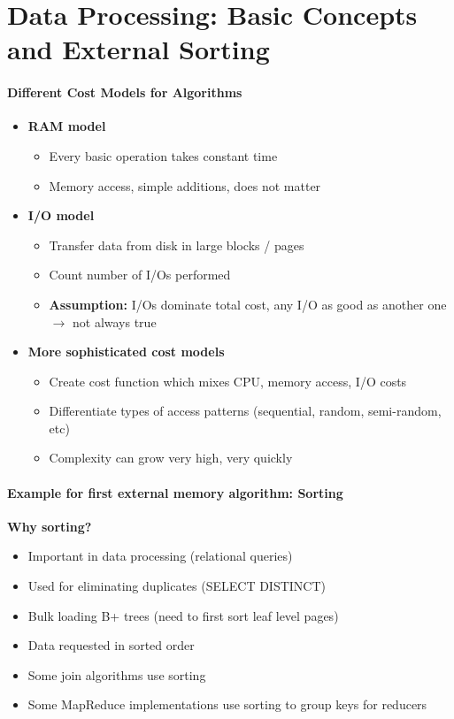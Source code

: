 \section{Data Processing: Basic Concepts and External Sorting}

\paragraph{Different Cost Models for Algorithms}
\begin{itemize}
\item \textbf{RAM model}
  \begin{itemize}
  \item Every basic operation takes constant time
  \item Memory access, simple additions, does not matter
  \end{itemize}

\item \textbf{I/O model}
  \begin{itemize}
  \item Transfer data from disk in large blocks / pages
  \item Count number of I/Os performed
  \item \textbf{Assumption:} I/Os dominate total cost, any
    I/O as good as another one $\rightarrow$ not always true
  \end{itemize}

\item \textbf{More sophisticated cost models}
  \begin{itemize}
  \item Create cost function which mixes CPU, memory
    access, I/O costs
  \item Differentiate types of access patterns
    (sequential, random, semi-random, etc)
  \item Complexity can grow very high, very quickly
  \end{itemize}
\end{itemize}

\paragraph{Example for first external memory algorithm: Sorting}

\textbf{Why sorting?}
\begin{itemize}
\item Important in data processing (relational queries)
\item Used for eliminating duplicates (SELECT DISTINCT)
\item Bulk loading B+ trees (need to first sort leaf level pages)
\item Data requested in sorted order
\item Some join algorithms use sorting
\item Some MapReduce implementations use sorting to group keys
  for reducers
\end{itemize}

